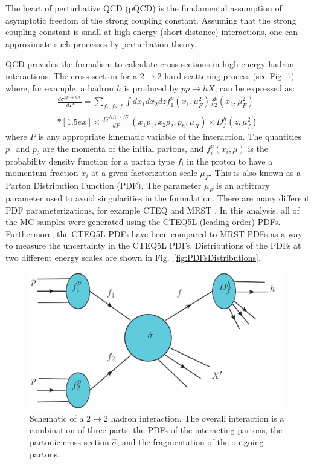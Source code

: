 The heart of perturbative QCD (pQCD) is the fundamental assumption of asymptotic freedom of the strong coupling constant. Assuming that the strong coupling constant \alphas is small at high-energy (short-distance) interactions, one can approximate such processes by perturbation theory.

QCD provides the formalism to calculate cross sections in high-energy hadron interactions. The cross section for a $2\to2$ hard scattering process (see Fig. \ref{fig:HadHadScattering}) where, for example, a hadron $h$ is produced by $pp \to hX$, can be expressed as:
\begin{eqnarray}
 \frac{d\sigma^{pp\to hX}}{dP} = \sum_{f_{1},f_{2},f} \int dx_{1} dx_{2} dz f_{1}^{p}(x_{1},\mu^{2}_{F}) f_{2}^{p}(x_{2},\mu^{2}_{F}) \nonumber\\*[1.5ex]
 \times \frac{d\hat{\sigma}^{f_{1}f_{2}\to fX^{\prime}}}{dP}(x_{1}p_{1},x_{2}p_{2},p_{h},\mu_{R})\times D_{f}^{h}(z,\mu^{2}_{f})
\end{eqnarray}
where $P$ is any appropriate kinematic variable of the interaction. The quantities $p_{1}$ and $p_{2}$ are the momenta of the initial partons, and $f_{i}^{p}(x_{i},\mu)$ is the probability density function for a parton type $f_{i}$ in the proton to have a momentum fraction $x_{i}$ at a given factorization scale $\mu_{F}$. This is also known as a Parton Distribution Function (PDF). The parameter $\mu_{F}$ is an arbitrary parameter used to avoid singularities in the formulation. There are many different PDF parameterizations, for example CTEQ \cite{pap:CTEQPDF} and MRST \cite{pap:MRSTPDF}. In this analysis, all of the MC samples were generated using the CTEQ5L (leading-order) PDFs. Furthermore, the CTEQ5L PDFs have been compared to MRST PDFs as a way to measure the uncertainty in the CTEQ5L PDFs. Distributions of the PDFs at two different energy scales are shown in Fig.~\ref{fig:PDFsDistributions}.

\begin{figure}[htbm!]
 \centering
 \includegraphics[scale=0.4,keepaspectratio=true]{./hh_collision.pdf}
 \caption[Schematic of a $2\to2$ hadron interaction.]{Schematic of a $2\to2$ hadron interaction. The overall interaction is a combination of three parts: the PDFs of the interacting partons, the partonic cross section $\hat{\sigma}$, and the fragmentation of the outgoing partons.}
 \label{fig:HadHadScattering}
\end{figure}

